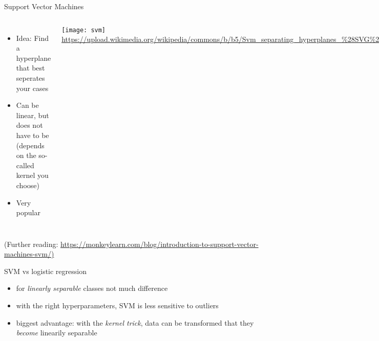 \begin{frame}{Support Vector Machines}
	\begin{columns}
		\begin{itemize}
			\item	Idea: Find a hyperplane that best seperates your cases
			\item Can be linear, but does not have to be (depends on the so-called kernel you choose)
			\item Very popular 
		\end{itemize}
		\texttt{[image: svm]}
		\tiny{\url{https://upload.wikimedia.org/wikipedia/commons/b/b5/Svm\_separating\_hyperplanes\_\%28SVG\%29.svg}}
	\end{columns}
	\vfill
	\tiny{(Further reading: \url{https://monkeylearn.com/blog/introduction-to-support-vector-machines-svm/)}}\\
\end{frame}

\begin{frame}{SVM vs logistic regression}
\begin{itemize}
	\item for \emph{linearly separable} classes not much difference
	\item with the right hyperparameters, SVM is less sensitive to outliers
	\item biggest advantage: with the \emph{kernel trick}, data can be transformed that they \emph{become} linearily separable
\end{itemize}
\end{frame}


